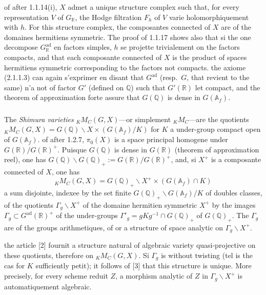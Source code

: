 \documentclass[12pt,a4paper]{article}
\theoremstyle{plain}
\theoremstyle{definition}
\theoremstyle{remark}
\newcommand{\QQ}{\mathbb{Q}}
\newcommand{\RR}{\mathbb{R}}
\newcommand{\Af}{\mathbb{A}_f}
\begin{document}
of after 1.1.14(i), $X$ admet a unique structure complex such that, for every representation $V$ of $G_{\RR}$, the Hodge filtration $F_h$ of $V$ varie holomorphiquement with $h$. For this structure complex, the composantes connected of $X$ are of the domaines hermitiens symmetric. The proof of 1.1.17 shows also that si the one decompose $G^{\text{ad}}_{\RR}$ en factors simples, $h$ se projette trivialement on the factors compacts, and that each composante connected of $X$ is the product of spaces hermitiens symmetric corresponding to the factors not compacts. the axiome (2.1.1.3) can again s'exprimer en disant that $G^{\text{ad}}$ (resp.~$G$, that revient to the same) n'a not of factor $G'$ (defined on $\QQ$) such that $G'(\RR)$ let compact, and the theorem of approximation forte assure that $G(\QQ)$ is dense in $G(\Af)$.

\subsubsection{}

The \textit{Shimura varieties} ${}_K M_C(G,X)$---or simplement ${}_K M_C$---are the quotients ${}_K M_C(G,X) = G(\QQ)\backslash X \times (G(\Af)/K)$ for $K$ a under-group compact open of $G(\Af)$. of after 1.2.7, $\pi_0(X)$ is a space principal homogene under $G(\RR)/G(\RR)^+$. Puisque $G(\QQ)$ is dense in $G(\RR)$ (theorem of approximation reel), one has $G(\QQ)\backslash G(\QQ)_+ := G(\RR)/G(\RR)^+$, and, si $X^+$ is a composante connected of $X$, one has
\[
{}_K M_C(G,X) = G(\QQ)_+\backslash X^+ \times (G(\Af)\cap K)
\]
a sum disjointe, indexee by the set finite $G(\QQ)_+\backslash G(\Af)/K$ of doubles classes, of the quotients $\Gamma_g\backslash X^+$ of the domaine hermitien symmetric $X^+$ by the images $\Gamma_g \subset G^{\text{ad}}(\RR)^+$ of the under-groups $\Gamma'_g = gKg^{-1} \cap G(\QQ)_+$ of $G(\QQ)_+$. The $\Gamma_g$ are of the groups arithmetiques, of or a structure of space analytic on $\Gamma_g\backslash X^+$.

the article [2] fournit a structure natural of algebraic variety quasi-projective on these quotients, therefore on ${}_K M_C(G,X)$. Si $\Gamma_g$ is without twisting (tel is the cas for $K$ sufficiently petit); it follows of [3] that this structure is unique. More precisely, for every scheme reduit $Z$, a morphism analytic of $Z$ in $\Gamma_g\backslash X^+$ is automatiquement algebraic.

\subsubsection{}
\end{document}
